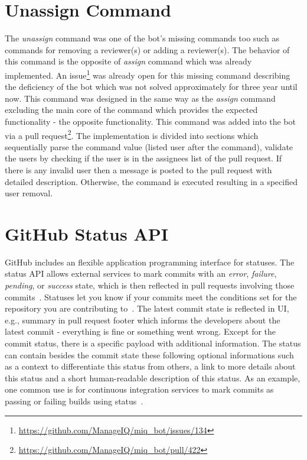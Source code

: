 \section{Unassign Command}

The \textit{unassign} command was one of the bot's missing commands too such as commands for removing a reviewer(s) or adding a reviewer(s). The behavior of this command is the opposite of \textit{assign} command which was already implemented. An issue\footnote{\url{https://github.com/ManageIQ/miq_bot/issues/134}} was already open for this missing command describing the deficiency of the bot which was not solved approximately for three year until now. This command was designed in the same way as the \textit{assign} command excluding the main core of the command which provides the expected functionality - the opposite functionality. This command was added into the bot via a pull request\footnote{\url{https://github.com/ManageIQ/miq_bot/pull/422}}. The implementation is divided into sections which sequentially parse the command value (listed user after the command), validate the users by checking if the user is in the assignees list of the pull request. If there is any invalid user then a message is posted to the pull request with detailed description. Otherwise, the command is executed resulting in a specified user removal.

\section{GitHub Status API}

GitHub includes an flexible application programming interface for statuses. The status API allows external services to mark commits with an \textit{error}, \textit{failure}, \textit{pending}, or \textit{success} state, which is then reflected in pull requests involving those commits~\cite{GITHUB_STATUS_API}. Statuses let you know if your commits meet the conditions set for the repository you are contributing to~\cite{GITHUB_ABOUT_STATUSES}. The latest commit state is reflected in UI, e.g., summary in pull request footer which informs the developers about the latest commit - everything is fine or something went wrong. Except for the commit status, there is a specific payload with additional information. The status can contain besides the commit state these following optional informations such as a context to differentiate this status from others, a link to more details about this status and a short human-readable description of this status. As an example, one common use is for continuous integration services to mark commits as passing or failing builds using status~\cite{GITHUB_STATUS_API}.

